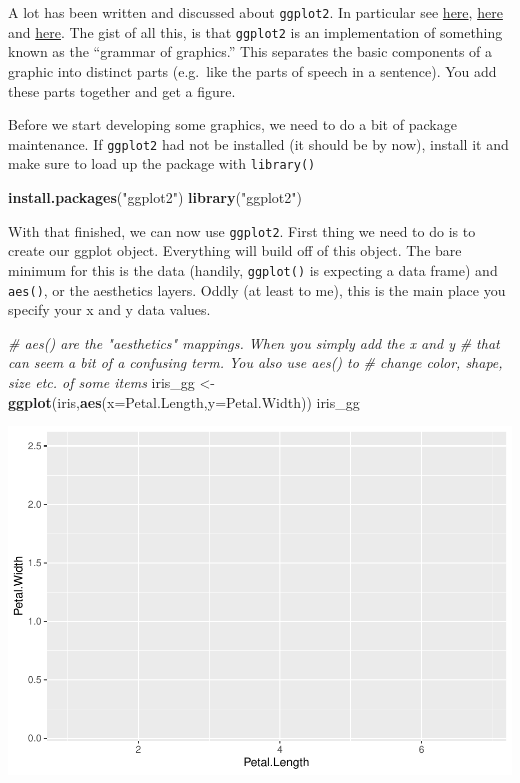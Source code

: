 \documentclass[]{article}
\newenvironment{Shaded}{\begin{snugshade}}{\end{snugshade}}
\newcommand{\CommentTok}[1]{\textcolor[rgb]{0.56,0.35,0.01}{\textit{#1}}}
\newcommand{\DataTypeTok}[1]{\textcolor[rgb]{0.13,0.29,0.53}{#1}}
\newcommand{\KeywordTok}[1]{\textcolor[rgb]{0.13,0.29,0.53}{\textbf{#1}}}
\newcommand{\NormalTok}[1]{#1}
\newcommand{\StringTok}[1]{\textcolor[rgb]{0.31,0.60,0.02}{#1}}
\begin{document}
A lot has been written and discussed about \texttt{ggplot2}. In
particular see \href{http://ggplot2.org/}{here},
\href{http://docs.ggplot2.org/current/}{here} and
\href{https://github.com/karthikram/ggplot-lecture}{here}. The gist of
all this, is that \texttt{ggplot2} is an implementation of something
known as the ``grammar of graphics.'' This separates the basic
components of a graphic into distinct parts (e.g.~like the parts of
speech in a sentence). You add these parts together and get a figure.

Before we start developing some graphics, we need to do a bit of package
maintenance. If \texttt{ggplot2} had not be installed (it should be by
now), install it and make sure to load up the package with
\texttt{library()}

\begin{Shaded}
\begin{Highlighting}[]
\KeywordTok{install.packages}\NormalTok{(}\StringTok{"ggplot2"}\NormalTok{)}
\KeywordTok{library}\NormalTok{(}\StringTok{"ggplot2"}\NormalTok{)}
\end{Highlighting}
\end{Shaded}

With that finished, we can now use \texttt{ggplot2}. First thing we need
to do is to create our ggplot object. Everything will build off of this
object. The bare minimum for this is the data (handily,
\texttt{ggplot()} is expecting a data frame) and \texttt{aes()}, or the
aesthetics layers. Oddly (at least to me), this is the main place you
specify your x and y data values.

\begin{Shaded}
\begin{Highlighting}[]
\CommentTok{# aes() are the "aesthetics" mappings.  When you simply add the x and y}
\CommentTok{# that can seem a bit of a confusing term.  You also use aes() to }
\CommentTok{# change color, shape, size etc. of some items }
\NormalTok{iris_gg <-}\StringTok{ }\KeywordTok{ggplot}\NormalTok{(iris,}\KeywordTok{aes}\NormalTok{(}\DataTypeTok{x=}\NormalTok{Petal.Length,}\DataTypeTok{y=}\NormalTok{Petal.Width))}
\NormalTok{iris_gg}
\end{Highlighting}
\end{Shaded}

\includegraphics{figures/unnamed-chunk-2-1.pdf}
\end{document}
